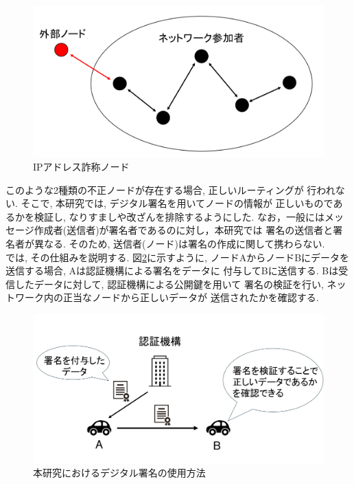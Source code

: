 \begin{figure}
  \centering
  \includegraphics[scale=0.6]{figures/ip-liar.png}
  \caption{IPアドレス詐称ノード}
  \label{fig:ip-liar}
\end{figure}

\indent このような2種類の不正ノードが存在する場合, 正しいルーティングが
行われない. そこで, 本研究では, デジタル署名を用いてノードの情報が
正しいものであるかを検証し, なりすましや改ざんを排除するようにした. 
なお，一般にはメッセージ作成者(送信者)が署名者であるのに対し，本研究では
署名の送信者と署名者が異なる. そのため, 送信者(ノード)は署名の作成に関して携わらない.  \\
\indent では, その仕組みを説明する. 図\ref{fig:signature-method}に示すように, 
ノードAからノードBにデータを送信する場合, Aは認証機構による署名をデータに
付与してBに送信する. Bは受信したデータに対して, 認証機構による公開鍵を用いて
署名の検証を行い, ネットワーク内の正当なノードから正しいデータが
送信されたかを確認する. 
\newpage

\begin{figure}
  \centering
  \includegraphics[scale=0.6]{figures/signature-method.png}
  \caption{本研究におけるデジタル署名の使用方法}
  \label{fig:signature-method}
\end{figure}

